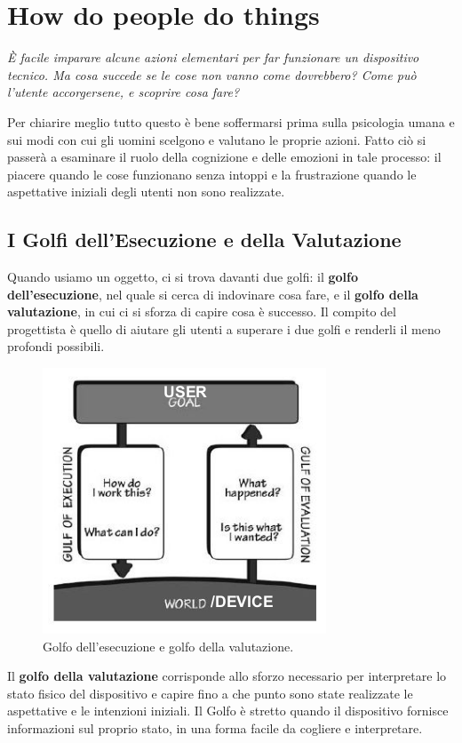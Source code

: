 \chapter{How do people do things}
\begin{flushleft}
	\textit{
		È facile imparare alcune azioni elementari per far funzionare un dispositivo tecnico. Ma cosa succede se le cose non vanno come dovrebbero? Come può l'utente accorgersene, e scoprire cosa fare? }
\end{flushleft}

Per chiarire meglio tutto questo è bene soffermarsi prima sulla psicologia umana e sui modi con cui gli uomini scelgono e valutano le proprie azioni. Fatto ciò si passerà a esaminare il ruolo della cognizione e delle emozioni in tale processo: il piacere quando le cose funzionano senza intoppi e la frustrazione quando le aspettative iniziali degli utenti non sono realizzate.

\section{I Golfi dell'Esecuzione e della Valutazione}
Quando usiamo un oggetto, ci si trova davanti due golfi: il \textbf{golfo dell'esecuzione}, nel quale si cerca di indovinare cosa fare, e il \textbf{golfo della valutazione}, in cui ci si sforza di capire cosa è successo. Il compito del progettista è quello di aiutare gli utenti a superare i due golfi e renderli il meno profondi possibili.

\begin{figure}[!h]
	\centering
	\includegraphics[scale=0.73]{immagini/Golfi}
	\caption{Golfo dell'esecuzione e golfo della valutazione.}
\end{figure}

Il \textbf{golfo della valutazione} corrisponde allo sforzo necessario per interpretare lo stato fisico del dispositivo e capire fino a che punto sono state realizzate le aspettative e le intenzioni iniziali. Il Golfo è stretto quando il dispositivo fornisce informazioni sul proprio stato, in una forma facile da cogliere e interpretare.

